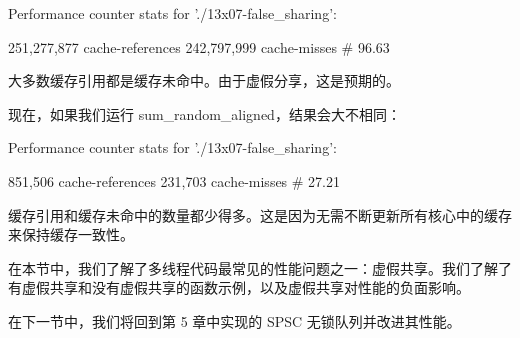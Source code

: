 \begin{shell}
Performance counter stats for './13x07-false_sharing':

     251,277,877     cache-references
     242,797,999     cache-misses
                     # 96.63%
\end{shell}

大多数缓存引用都是缓存未命中。由于虚假分享，这是预期的。

现在，如果我们运行 sum\_random\_aligned，结果会大不相同：

\begin{shell}
Performance counter stats for './13x07-false_sharing':

          851,506    cache-references
          231,703    cache-misses
                     # 27.21%
\end{shell}

缓存引用和缓存未命中的数量都少得多。这是因为无需不断更新所有核心中的缓存来保持缓存一致性。

在本节中，我们了解了多线程代码最常见的性能问题之一：虚假共享。我们了解了有虚假共享和没有虚假共享的函数示例，以及虚假共享对性能的负面影响。

在下一节中，我们将回到第 5 章中实现的 SPSC 无锁队列并改进其性能。















